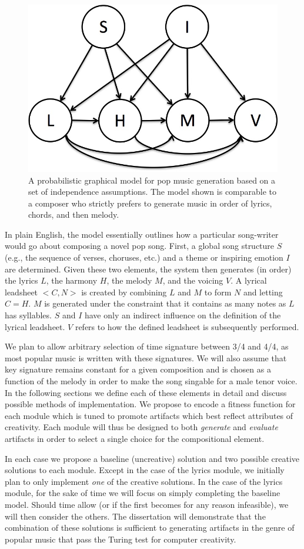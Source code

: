 \documentclass[11pt,phd]{byuprop}
\begin{document}
\begin{figure}
  \centering
  \includegraphics[width=.35\textwidth]{graphics/graphical_model.jpg}
  \caption{A probabilistic graphical model for pop music generation based on a set of independence assumptions. The model shown is comparable to a composer who strictly prefers to generate music in order of lyrics, chords, and then melody.}
    \label{fig:graphical_model}
\end{figure}

In plain English, the model essentially outlines how a particular song-writer would go about composing a novel pop song. First, a global song structure $S$ (e.g., the sequence of verses, choruses, etc.) and a theme or inspiring emotion $I$ are determined. Given these two elements, the system then generates (in order) the lyrics $L$, the harmony $H$, the melody $M$, and the voicing $V$. A lyrical leadsheet $<C,N>$ is created by combining $L$ and $M$ to form $N$ and letting $C = H$. $M$ is generated under the constraint that it contains as many notes as $L$ has syllables. $S$ and $I$ have only an indirect influence on the definition of the lyrical leadsheet. $V$ refers to how the defined leadsheet is subsequently performed.

We plan to allow arbitrary selection of time signature between 3/4 and 4/4, as most popular music is written with these signatures. We will also assume that key signature remains constant for a given composition and is chosen as a function of the melody in order to make the song singable for a male tenor voice. In the following sections we define each of these elements in detail and discuss possible methods of implementation.  We propose to encode a fitness function for each module which is tuned to promote artifacts which best reflect attributes of creativity. Each module will thus be designed to both \emph{generate} and \emph{evaluate} artifacts in order to select a single choice for the compositional element.

In each case we propose a baseline (uncreative) solution and two possible creative solutions to each module. Except in the case of the lyrics module, we initially plan to only implement \emph{one} of the creative solutions. In the case of the lyrics module, for the sake of time we will focus on simply completing the baseline model. Should time allow (or if the first becomes for any reason infeasible), we will then consider the others. The dissertation will demonstrate that the combination of these solutions is sufficient to generating artifacts in the genre of popular music that pass the Turing test for computer creativity.
\end{document}
